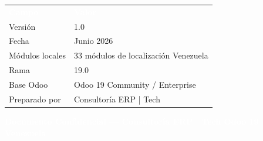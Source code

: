 \documentclass[11pt,a4paper]{article}
\begin{document}
\begin{titlepage}
\begin{center}
\begin{tabular}{L{3.8cm} L{7.5cm}}
  \textcolor{white}{\textbf{Campo}} & \textcolor{white}{\textbf{Valor}} \\
  Versión & 1.0 \\
  Fecha & Junio 2026 \\
  Módulos locales & 33 módulos de localización Venezuela \\
  Rama & 19.0 \\
  Base Odoo & Odoo 19 Community / Enterprise \\
  Preparado por & Consultoría ERP | Tech \\
\end{tabular}
\end{center}

\vfill

\begin{center}
  \textcolor{white}{\textbf{Documento Confidencial — Consultoría ERP | Tech \hfill Odoo 19 Venezuela}}
\end{center}
\vspace{0.5cm}

\end{titlepage}
\end{document}
